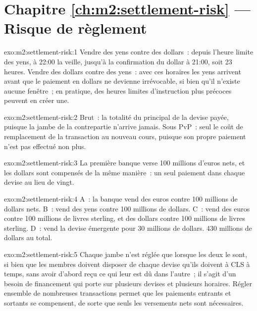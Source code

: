 \section*{Chapitre \ref{ch:m2:settlement-risk} --- Risque de règlement}

\begin{solution}{exo:m2:settlement-risk:1}
Vendre des yens contre des dollars~: depuis l'heure limite des yens, à 22:00 la veille, jusqu'à la
confirmation du dollar à 21:00, soit 23 heures. Vendre des dollars contre des yens~: avec ces horaires
les yens arrivent avant que le paiement en dollars ne devienne irrévocable, si bien qu'il n'existe aucune fenêtre~;
en pratique, des heures limites d'instruction plus précoces peuvent en créer une.
\end{solution}

\begin{solution}{exo:m2:settlement-risk:2}
Brut~: la totalité du principal de la devise payée, puisque la jambe de la contrepartie
n'arrive jamais. Sous PvP~: seul le coût de remplacement de la transaction au nouveau cours, puisque
son propre paiement n'est pas effectué non plus.
\end{solution}

\begin{solution}{exo:m2:settlement-risk:3}
La première banque verse 100 millions d'euros nets, et les dollars sont compensés de la même manière~:
un seul paiement dans chaque devise au lieu de vingt.
\end{solution}

\begin{solution}{exo:m2:settlement-risk:4}
A~: la banque vend des euros contre 100 millions de dollars nets. B~: vend des yens contre 100 millions de dollars. C~:
vend des euros contre 100 millions de livres sterling, et des dollars contre 100 millions de livres sterling. D~:
vend la devise émergente pour 30 millions de dollars. 430 millions de dollars au total.
\end{solution}

\begin{solution}{exo:m2:settlement-risk:5}
Chaque jambe n'est réglée que lorsque les deux le sont, si bien que les membres doivent disposer de chaque devise qu'ils doivent
à CLS à temps, sans avoir d'abord reçu ce qui leur est dû dans l'autre~; il s'agit d'un
besoin de financement qui porte sur plusieurs devises et plusieurs horaires. Régler ensemble de nombreuses transactions permet
que les paiements entrants et sortants se compensent, de sorte que seuls les versements nets sont nécessaires.
\end{solution}

